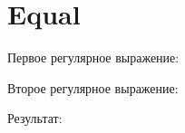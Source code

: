 \section{Equal}
\begin{frame}{}
	Первое регулярное выражение:


	Второе регулярное выражение:


	Результат:

\end{frame}
